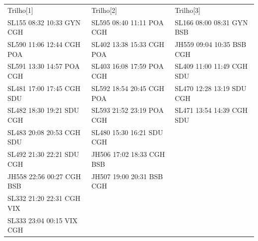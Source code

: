 \documentclass{endm}
\begin{document}
\begin{center}

\renewcommand{\arraystretch}{0.6}

\label {tabela3}
\begin{longtable}{lll} 

\\

\scriptsize Trilho[1] &	 \scriptsize Trilho[2] & \scriptsize Trilho[3]\\
\scriptsize SL155 08:32 10:33 GYN CGH  & \scriptsize SL595 08:40 11:11 POA CGH & 		\scriptsize SL166 08:00 08:31 GYN BSB\\
\scriptsize SL590 11:06 12:44 CGH POA	 & \scriptsize SL402 13:38 15:33 CGH POA &		\scriptsize JH559 09:04 10:35 BSB CGH\\
\scriptsize SL591 13:30 14:57 POA CGH & 	\scriptsize SL403 16:08 17:59 POA CGH & 	\scriptsize SL409 11:00 11:49 CGH SDU\\
\scriptsize SL481 17:00 17:45 CGH SDU & 	\scriptsize SL592 18:54 20:45 CGH POA & 	\scriptsize SL470 12:28 13:19 SDU CGH\\
\scriptsize SL482 18:30 19:21 SDU CGH & 	\scriptsize SL593 21:52 23:19 POA CGH & 	\scriptsize SL471 13:54 14:39 CGH SDU\\
\scriptsize SL483 20:08 20:53 CGH SDU & 	\scriptsize SL480 15:30 16:21 SDU CGH  & \\
\scriptsize SL492 21:30 22:21 SDU CGH & 	\scriptsize JH506 17:02 18:33 CGH BSB  & \\
\scriptsize JH558 22:56 00:27 CGH BSB &       \scriptsize JH507 19:00 20:31 BSB CGH  & \\
\scriptsize SL332 21:20 22:31 CGH VIX  &  & \\
\scriptsize SL333 23:04 00:15 VIX CGH   &    & \\ 
	

\end{longtable}
\end{center}
\end{document}
